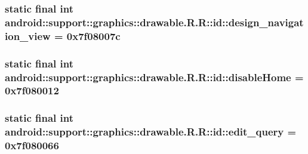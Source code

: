 \hypertarget{classandroid_1_1support_1_1graphics_1_1drawable_1_1_r_1_1id_1557b55a0a79b4e435ce60165dd76db2}{
\subsubsection[{design\_\-navigation\_\-view}]{\setlength{\rightskip}{0pt plus 5cm}static final int android::support::graphics::drawable.R.R::id::design\_\-navigation\_\-view = 0x7f08007c}}
\label{classandroid_1_1support_1_1graphics_1_1drawable_1_1_r_1_1id_1557b55a0a79b4e435ce60165dd76db2}


\hypertarget{classandroid_1_1support_1_1graphics_1_1drawable_1_1_r_1_1id_d31422df6ddb16b752d57897df677650}{
\subsubsection[{disableHome}]{\setlength{\rightskip}{0pt plus 5cm}static final int android::support::graphics::drawable.R.R::id::disableHome = 0x7f080012}}
\label{classandroid_1_1support_1_1graphics_1_1drawable_1_1_r_1_1id_d31422df6ddb16b752d57897df677650}


\hypertarget{classandroid_1_1support_1_1graphics_1_1drawable_1_1_r_1_1id_46bb15021b3e23a0dfe5c780664f94ee}{
\subsubsection[{edit\_\-query}]{\setlength{\rightskip}{0pt plus 5cm}static final int android::support::graphics::drawable.R.R::id::edit\_\-query = 0x7f080066}}
\label{classandroid_1_1support_1_1graphics_1_1drawable_1_1_r_1_1id_46bb15021b3e23a0dfe5c780664f94ee}


